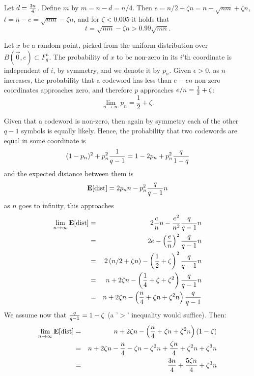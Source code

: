 \documentclass[11pt]{article} \usepackage{amssymb}
\newcommand{\E}{{\bf E}} \newcommand{\Cov}{{\bf Cov}}
\newcommand{\half}{{\textstyle \frac12}}
\begin{document}
\begin{enumerate}
\begin{enumerate}
      Let $d={3n\over 4}$. Define $m$ by $m=n-d=n/4$. Then
      $e=n/2+\zeta n=n-\sqrt{nm}+\zeta n$, 
      $t=n-e=\sqrt{nm}-\zeta n$, and for $\zeta < 0.005$
       it holds that
      \begin{equation*}
        t=\sqrt{nm} - \zeta n > 0.99\sqrt{mn}.
      \end{equation*}

      Let $x$ be a random point, picked from the uniform distribution
      over $B(\vec{0},e)\subset F_q^n$. The probability of $x$ to be non-zero
      in its $i$'th coordinate is independent of $i$, by symmetry,
      and we denote it by $p_n$. Given $\epsilon>0$, as $n$ increases, 
      the probability that a codeword has less than $e-\epsilon n$ non-zero
      coordinates approaches zero, and therefore $p$ approaches 
      $e/n={1\over 2}+\zeta$:
      \begin{equation*}
        \lim_{n\to\infty}p_n=\half+\zeta.
      \end{equation*}

      Given that a codeword is non-zero, then again by symmetry each
      of the other $q-1$ symbols is equally likely. Hence, the probability
      that two codewords are equal in some coordinate is
      \begin{equation*}
        (1-p_n)^2+p_n^2{1\over q-1}=1-2p_n+p_n^2{q\over 1-q}
      \end{equation*}
      and the expected distance between them is
      \begin{equation*}
        \E[\mbox{dist}]=2p_nn-p_n^2{q\over q-1}n
      \end{equation*}
      as $n$ goes to infinity, this approaches
      \begin{eqnarray*}
        \lim_{n\to\infty}\E[\mbox{dist}] &=&  2{e\over n}n-{e^2\over n^2}{q\over q-1}n 
        \\ &=&2e-\left({e\over n}\right)^2{q\over q-1}n
        \\ &=&2\left(n/2+\zeta n\right)-\left({1\over 2}+\zeta\right)^2{q\over q-1}n
        \\ &=&n+2\zeta n-\left({1\over 4}+\zeta+\zeta^2\right){q\over q-1}n
        \\ &=&n+2\zeta n-\left({n\over 4}+\zeta n+\zeta^2n\right){q\over q-1}
      \end{eqnarray*}
      We assume now that ${q\over q-1}=1-\zeta$ (a '$>$' inequality would suffice). 
      Then:
      \begin{eqnarray*}
        \lim_{n\to\infty}\E[\mbox{dist}]&=& n+2\zeta n-
        \left({n\over 4}+\zeta n+\zeta^2n\right)(1-\zeta)
        \\ &=& n+2\zeta n-{n\over 4}-\zeta n-\zeta^2n+
        {\zeta n\over 4}+\zeta^2 n+\zeta^3n
        \\ &=& {3n\over 4}+{5\zeta n\over 4}+\zeta^3n
      \end{eqnarray*}


\end{enumerate}
\end{enumerate}
\end{document}
